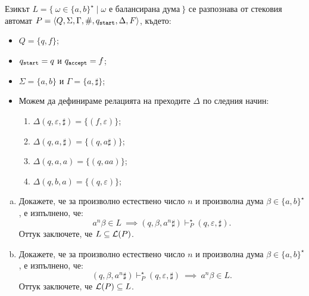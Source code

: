 \begin{extra}
\begin{example}
  \label{ex:context-free:push-down-solved-examples:balanced}
  Езикът $L = \{\ \omega \in \{a,b\}^\star \mid \omega\text{ е балансирана дума}\ \}$
  се разпознава от стековия автомат $P = \langle{Q,\Sigma,\Gamma,\#,q_{\texttt{start}},\Delta,F}\rangle$, където:
  \begin{itemize}
  \item 
    $Q = \{q,f\}$;
  \item
    $q_{\texttt{start}} = q$ и $q_{\texttt{accept}} = f$;
  \item
    $\Sigma = \{a,b\}$ и $\Gamma = \{a, \sharp\}$;
  \item
    Можем да дефинираме релацията на преходите $\Delta$ по следния начин:
    \begin{enumerate}[(1)]
    \item 
      $\Delta(q, \varepsilon, \sharp) = \{(f, \varepsilon)\}$;
    \item
      $\Delta(q, a, \sharp) = \{(q, a\sharp)\}$;
    \item
      $\Delta(q, a, a) = \{(q, aa)\}$;
    \item
      $\Delta(q, b, a) = \{(q, \varepsilon)\}$;
    \end{enumerate}
  \end{itemize}  
  \begin{enumerate}[(a)]
  \item
    Докажете, че за произволно естествено число $n$ и произволна дума $\beta \in \{a, b\}^\star$, 
    е изпълнено, че:
    \[a^n\beta \in L\ \implies (q, \beta, a^n\sharp) \vdash^\star_P (q, \varepsilon, \sharp).\]
    Оттук заключете, че $L \subseteq \mathcal{L}(P)$.
  \item
    Докажете, че за произволно естествено число $n$ и произволна дума $\beta \in \{a, b\}^\star$, е изпълнено, че:
    \[(q,\beta,a^n\sharp) \vdash^\star_P (q, \varepsilon, \sharp)\ \implies\ a^n\beta \in L.\]
    Оттук заключете, че $\mathcal{L}(P) \subseteq L$.
  \end{enumerate}
\end{example}
\end{extra}


